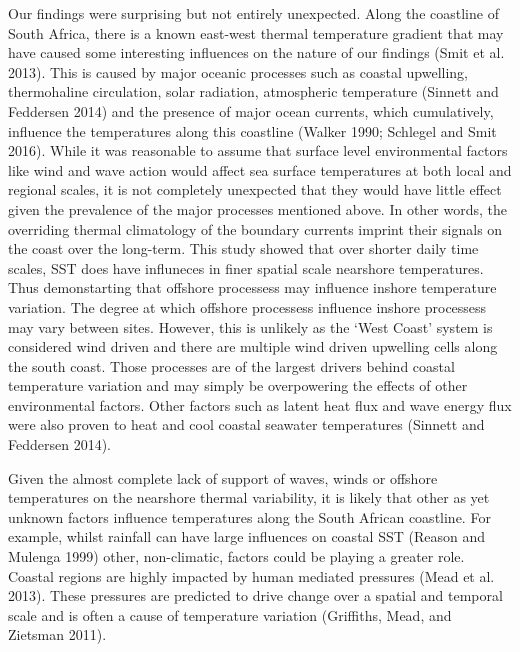 \documentclass[12pt,a4paper,]{article}
\begin{document}
Our findings were surprising but not entirely unexpected. Along the
coastline of South Africa, there is a known east-west thermal
temperature gradient that may have caused some interesting influences on
the nature of our findings (Smit et al. 2013). This is caused by major
oceanic processes such as coastal upwelling, thermohaline circulation,
solar radiation, atmospheric temperature (Sinnett and Feddersen 2014)
and the presence of major ocean currents, which cumulatively, influence
the temperatures along this coastline (Walker 1990; Schlegel and Smit
2016). While it was reasonable to assume that surface level
environmental factors like wind and wave action would affect sea surface
temperatures at both local and regional scales, it is not completely
unexpected that they would have little effect given the prevalence of
the major processes mentioned above. In other words, the overriding
thermal climatology of the boundary currents imprint their signals on
the coast over the long-term. This study showed that over shorter daily
time scales, SST does have influneces in finer spatial scale nearshore
temperatures. Thus demonstarting that offshore processess may influence
inshore temperature variation. The degree at which offshore processess
influence inshore processess may vary between sites. However, this is
unlikely as the `West Coast' system is considered wind driven and there
are multiple wind driven upwelling cells along the south coast. Those
processes are of the largest drivers behind coastal temperature
variation and may simply be overpowering the effects of other
environmental factors. Other factors such as latent heat flux and wave
energy flux were also proven to heat and cool coastal seawater
temperatures (Sinnett and Feddersen 2014).

Given the almost complete lack of support of waves, winds or offshore
temperatures on the nearshore thermal variability, it is likely that
other as yet unknown factors influence temperatures along the South
African coastline. For example, whilst rainfall can have large
influences on coastal SST (Reason and Mulenga 1999) other, non-climatic,
factors could be playing a greater role. Coastal regions are highly
impacted by human mediated pressures (Mead et al. 2013). These pressures
are predicted to drive change over a spatial and temporal scale and is
often a cause of temperature variation (Griffiths, Mead, and Zietsman
2011).
\end{document}
